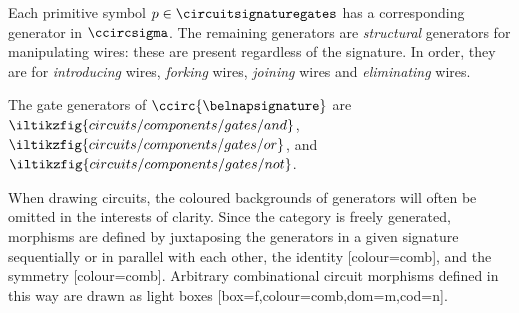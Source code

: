 Each primitive symbol \(p \in \circuitsignaturegates\) has a corresponding
generator in \(\ccircsigma\).
The remaining generators are \emph{structural} generators for manipulating
wires: these are present regardless of the signature.
In order, they are for \emph{introducing} wires, \emph{forking}
wires, \emph{joining} wires and \emph{eliminating} wires.

\begin{example}
    The gate generators of \(\ccirc{\belnapsignature}\) are \(
    \iltikzfig{circuits/components/gates/and}
    \), \(
    \iltikzfig{circuits/components/gates/or}
    \), and \(
    \iltikzfig{circuits/components/gates/not}
    \).
\end{example}

When drawing circuits, the coloured backgrounds of generators will often be
omitted in the interests of clarity.
Since the category is freely generated, morphisms are defined by
juxtaposing the generators in a given signature sequentially or in parallel with
each other, the identity [colour=comb], and
the symmetry [colour=comb].
Arbitrary combinational circuit morphisms defined in this way are drawn as light
boxes [box=f,colour=comb,dom=m,cod=n].


